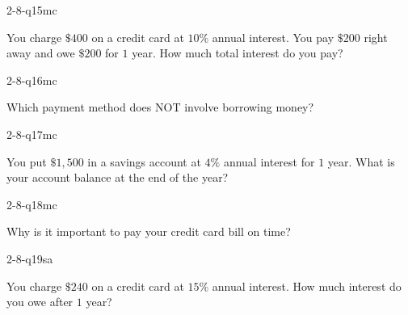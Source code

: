 \begin{practiceQuestion}{2-8-q15}{mc}
\begin{questionText}
You charge $\$400$ on a credit card at $10\%$ annual interest. You pay $\$200$ right away and owe $\$200$ for $1$ year. How much total interest do you pay?
\end{questionText}
\end{practiceQuestion}

\begin{practiceQuestion}{2-8-q16}{mc}
\begin{questionText}
Which payment method does NOT involve borrowing money?
\end{questionText}
\end{practiceQuestion}

\begin{practiceQuestion}{2-8-q17}{mc}
\begin{questionText}
You put $\$1{,}500$ in a savings account at $4\%$ annual interest for $1$ year. What is your account balance at the end of the year?
\end{questionText}
\end{practiceQuestion}

\begin{practiceQuestion}{2-8-q18}{mc}
\begin{questionText}
Why is it important to pay your credit card bill on time?
\end{questionText}
\end{practiceQuestion}


\begin{practiceQuestion}{2-8-q19}{sa}
\begin{questionText}
You charge $\$240$ on a credit card at $15\%$ annual interest. How much interest do you owe after $1$ year?
\end{questionText}
\end{practiceQuestion}

